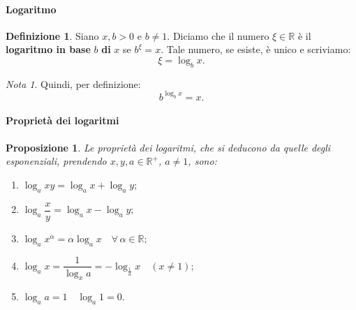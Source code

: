 \documentclass{article}
\theoremstyle{plain}
\newtheorem{prop}[thm]{Proposizione}
\theoremstyle{definition}
\newtheorem{defn}{Definizione}[section]
\theoremstyle{remark}
\newtheorem{note}{Nota}
\begin{document}
\vspace{10pt}

\paragraph{Logaritmo}
\begin{bxthm}
\begin{defn}
    Siano $x,b>0$ e $b\neq1$.
    Diciamo che il numero $\xi\in\mathbb{R}$ è il \textbf{logaritmo in base} $b$ \textbf{di} $x$ se $b^\xi=x$. 
    Tale numero, se esiste, è unico e scriviamo:
    \[ \xi=\log_bx .\]
\end{defn}
\end{bxthm}

\vspace{10pt}

\begin{note}
    Quindi, per definizione: \[b^{\log_bx}=x.\]
\end{note}

\vspace{10pt}

\paragraph{Proprietà dei logaritmi}
\begin{bxthm}
\begin{prop}
Le proprietà dei logaritmi, che si deducono da quelle degli esponenziali, prendendo $x,y,a \in\mathbb{R}^+$, $a\neq 1$, sono:
\begin{enumerate}
    \item $\log_axy=\log_ax+\log_ay;$
    \item $\log_a\dfrac{x}{y} = \log_ax-\log_ay;$
    \item $\log_ax^\alpha=\alpha\log_ax\quad\forall\,\alpha\in\mathbb{R};$
    \item $\log_ax=\dfrac{1}{\log_xa}=-\log_{\frac{1}{a}}x\quad(x\neq1);$
    \item $\log_aa=1\quad\log_a1=0.$
\end{enumerate}
\end{prop}
\end{bxthm}

\vspace{10pt}
\end{document}
